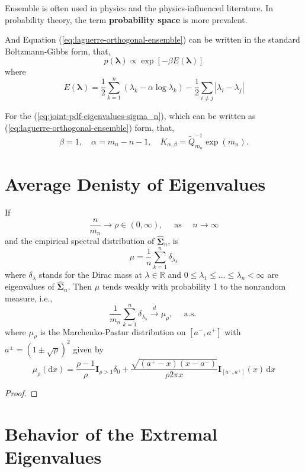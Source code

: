 \begin{remark}
    Ensemble is often used in physics and the physics-influenced literature. In probability theory, the term \textbf{probability space} is more prevalent.
\end{remark}

And Equation (\ref{eq:laguerre-orthogonal-ensemble}) can be written in the standard Boltzmann-Gibbs form, that,
\begin{equation*}
    p\left(\boldsymbol{\lambda}\right)\propto\exp\left[-\beta E\left(\boldsymbol{\lambda}\right)\right]
\end{equation*}
where
\begin{equation}
    E\left(\boldsymbol{\lambda}\right)=\frac{1}{2}\sum_{k=1}^{n}\left(\lambda_{k}-\alpha\log\lambda_{k}\right)-\frac{1}{2}\sum_{i\neq j}\left|\lambda_{i}-\lambda_{j}\right|
\end{equation}

For the (\ref{eq:joint-pdf-eigenvalues-sigma_n}), which can be written as (\ref{eq:laguerre-orthogonal-ensemble}) form, that,
\begin{equation*}
    \beta=1,\quad\alpha=m_{n}-n-1,\quad K_{\alpha,\beta}=\widetilde{Q}_{m_{n}}^{-1}\exp\left(m_{n}\right).
\end{equation*}

\section{Average Denisty of  Eigenvalues}

\begin{theorem}
    If
    \begin{equation*}
        \frac{n}{m_{n}}\rightarrow\rho\in(0,\infty),\quad\text{ as }\quad n\rightarrow\infty
    \end{equation*}
    and the empirical spectral distribution of $\widehat{\boldsymbol{\Sigma}}_{n}$, is
    \begin{equation*}
        \mu=\frac{1}{n}\sum_{k=1}^{n}\delta_{\lambda_{k}}
    \end{equation*}
    where $\delta_{\lambda}$ stands for the Dirac mass at $\lambda\in\mathbb{R}$ and $0\leq\lambda_{1}\leq\ldots\leq\lambda_{n}<\infty$ are eigenvalues of $\widehat{\boldsymbol{\Sigma}}_{n}$. Then $\mu$ tends weakly with probability 1 to the nonrandom measure, i.e.,
    \begin{equation}
        \frac{1}{m_{n}}\sum_{k=1}^{n}\delta_{\lambda_{k}}\stackrel{d}{\rightarrow}\mu_{\rho},\quad\text{ a.s. }
    \end{equation}
    where $\mu_{\rho}$ is the Marchenko-Pastur distribution on $\left[a^{-},a^{+}\right]$ with $a^{\pm}=(1\pm\sqrt{\rho})^{2}$ given by
    \begin{equation}
        \mu_{\rho}(\mathrm{d}x)=\frac{\rho-1}{\rho}\mathbf{I}_{\rho>1}\delta_{0}+\frac{\sqrt{\left(a^{+}-x\right)\left(x-a^{-}\right)}}{\rho 2\pi x}\mathbf{I}_{\left[a^{-},a^{+}\right]}(x)\,\mathrm{d}x
    \end{equation}
\end{theorem}

\begin{proof}
    
\end{proof}


\section{Behavior of the Extremal Eigenvalues}